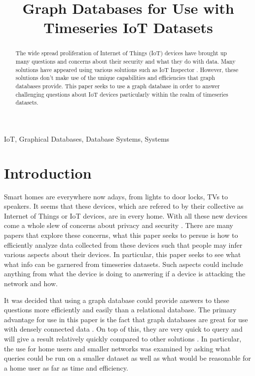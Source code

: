 \documentclass[conference]{IEEEtran}
\begin{document}
\title{Graph Databases for Use with Timeseries IoT Datasets}

\author{
}

\maketitle

\begin{abstract}
The wide spread proliferation of Internet of Things (IoT) devices
have brought up many questions and concerns about their security
and what they do with data. Many solutions have appeared using 
various solutions such as IoT Inspector \cite{IoTInspector}. 
However, these solutions don't make use of the unique capabilities
and efficiencies that graph databases provide. This paper seeks
to use a graph database in order to answer challenging questions 
about IoT devices particularly within the realm of timeseries datasets.
\end{abstract}

\begin{IEEEkeywords}
IoT, Graphical Databases, Database Systems, Systems
\end{IEEEkeywords}

\section{Introduction}
Smart homes are everywhere now adays, from lights to door locks, TVs to speakers.
It seems that these devices, which are refered to by their collective as Internet of Things or IoT devices, are in every home.
With all these new devices come a whole slew of concerns about privacy and security \cite{IoTInspector}.
There are many papers that explore these concerns, what this paper seeks to persue is how to efficiently analyze
data collected from these devices such that people may infer various aspects about their devices. In particular,
this paper seeks to see what what info can be garnered from timeseries datasets. Such aspects could include
anything from what the device is doing to answering if a device is attacking the network and how.

It was decided that using a graph database could provide answers to these questions
more efficiently and easily than a relational database. The primary advantage for use in this paper
is the fact that graph databases are great for use with densely connected data \cite{GraphSurvey}.
On top of this, they are very quick to query and will give a result relatively quickly compared to
other solutions \cite{GraphSurvey}. In particular, the use for home users and smaller networks was 
examined by asking what queries could be run on a smaller dataset as well as what would be reasonable
for a home user as far as time and efficiency.
\end{document}
